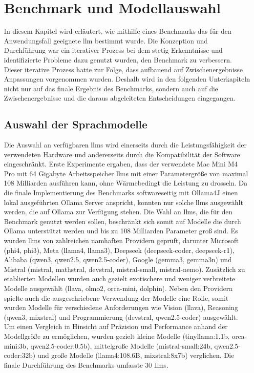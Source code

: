 \chapter{Benchmark und Modellauswahl}\label{ch:benchmark}

In diesem Kapitel wird erläutert, wie mithilfe eines Benchmarks das für den Anwendungsfall geeignete \gls{llm} bestimmt wurde.
Die Konzeption und Durchführung war ein iterativer Prozess bei dem stetig Erkenntnisse und identifizierte Probleme dazu genutzt wurden, den Benchmark zu verbessern.
Dieser iterative Prozess hatte zur Folge, dass aufbauend auf Zwischenergebnisse Anpassungen vorgenommen wurden.
Deshalb wird in den folgenden Unterkapiteln nicht nur auf das finale Ergebnis des Benchmarks, sondern auch auf die Zwischenergebnisse und die daraus abgeleiteten Entscheidungen eingegangen.

\section{Auswahl der Sprachmodelle}\label{sec:modelle-benchmark}

Die Auswahl an verfügbaren \glspl{llm} wird einerseits durch die Leistungsfähigkeit der verwendeten Hardware und andererseits durch die Kompatibilität der Software eingeschränkt.
Erste Experimente ergaben, dass der verwendete Mac Mini M4 Pro mit 64 Gigabyte Arbeitsspeicher \glspl{llm} mit einer Parametergröße von maximal 108 Milliarden ausführen kann, ohne Wärmebedingt die Leistung zu drosseln.
Da die finale Implementierung des Benchmarks softwareseitig mit Ollama4J einen lokal ausgeführten Ollama Server anspricht, konnten nur solche \glspl{llm} ausgewählt werden, die auf Ollama zur Verfügung stehen.
Die Wahl an \glspl{llm}, die für den Benchmark genutzt werden sollen, beschränkt sich somit auf Modelle die durch Ollama unterstützt werden und bis zu 108 Milliarden Parameter groß sind.
Es wurden \glspl{llm} von zahlreichen namhaften Providern geprüft, darunter Microsoft (phi4, phi3), Meta (llama4, llama3), Deepseek (deepseek-coder, deepseek-r1), Alibaba (qwen3, qwen2.5, qwen2.5-coder), Google (gemma3, gemma3n) und Mistral (mistral, mathstral, devstral, mistral-small, mistral-nemo).
Zusätzlich zu etablierten Modellen wurden auch gezielt exotischere und weniger verbreitete Modelle ausgewählt (llava, olmo2, orca-mini, dolphin).
Neben den Providern spielte auch die ausgeschriebene Verwendung der Modelle eine Rolle, somit wurden Modelle für verschiedene Anforderungen wie Vision (llava), Reasoning (qwen3, mixstral) und Programmierung (devstral, qwen2.5-coder) ausgewählt.
Um einen Vergleich in Hinsicht auf Präzision und Performance anhand der Modellgröße zu ermöglichen, wurden gezielt kleine Modelle (tinyllama:1.1b, orca-mini:3b, qwen2.5-coder:0.5b), mittelgroße Modelle (mistral-small:24b, qwen2.5-coder:32b) und große Modelle (llama4:108.6B, mixstral:8x7b) verglichen.
Die finale Durchführung des Benchmarks umfasste 30 \glspl{llm}.

